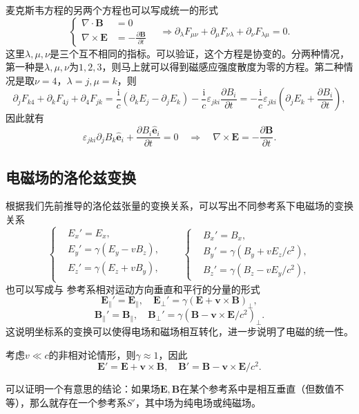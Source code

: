 \documentclass[UTF8]{ctexbook}
\renewcommand{\b}{\boldsymbol}
\renewcommand{\i}{\mathrm{i}}
\numberwithin{equation}{chapter}
\begin{document}
	麦克斯韦方程的另两个方程也可以写成统一的形式
	\[\left\{\begin{aligned}
		\nabla\cdot\b{B}&=0 \\
		\nabla\times\b{E}&=-\frac{\partial \b{B}}{\partial t} 
 	\end{aligned}
	\right.\quad \Rightarrow \partial_\lambda F_{\mu\nu}+\partial_\mu F_{\nu\lambda}+\partial_{\nu}F_{\lambda\mu}=0.\]
	这里$\lambda,\mu,\nu$是三个互不相同的指标。可以验证，这个方程是协变的。分两种情况，第一种是$\lambda,\mu,\nu$为$1,2,3$，则马上就可以得到磁感应强度散度为零的方程。第二种情况是取$\nu=4$，$\lambda=j,\mu=k$，则
	\[\partial_j F_{k4}+\partial_k F_{4j}+\partial_4 F_{jk}=\frac{\i}{c}(\partial_k E_j-\partial_j E_k)-\frac{\i}{c}\varepsilon_{jki}\frac{\partial B_i}{\partial t}=-\frac{\i}{c}\varepsilon_{jki}(\partial_j E_k+\frac{\partial B_i}{\partial t}),\]
	因此就有
	\[\varepsilon_{jki}\partial_j B_k\hat{\b{e}}_i+\frac{\partial B_i\hat{\b{e}}_i }{\partial t}=0\quad \Rightarrow \quad \nabla\times\b{E}=-\frac{\partial \b{B}}{\partial t}.\]
	
	\subsection{电磁场的洛伦兹变换}
	根据我们先前推导的洛伦兹张量的变换关系，可以写出不同参考系下电磁场的变换关系
	\[\left\{\begin{aligned}
		&E_x'=E_x,\\
		&E_y'=\gamma(E_y-vB_z),\\
		&E_z'=\gamma(E_z+vB_y),\\
	\end{aligned}\right.\qquad \left\{\begin{aligned}
	&B_x'=B_x,\\
	&B_y'=\gamma(B_y+vE_z/c^2),\\
	&B_z'=\gamma(B_z-vE_y/c^2),
\end{aligned}\right.\]
	也可以写成与 参考系相对运动方向垂直和平行的分量的形式
	\[\b{E}_{\parallel}'=\b{E}_\parallel,\quad \b{E}_{\perp}'=\gamma(\b{E}+\b{v}\times\b{B})_\perp,\]
	\[\b{B}_\parallel'=\b{B}_\parallel,\quad \b{B}_\perp'=\gamma(\b{B}-\b{v}\times\b{E}/c^2)_\perp.\]
	这说明坐标系的变换可以使得电场和磁场相互转化，进一步说明了电磁的统一性。
	
	考虑$v\ll c$的非相对论情形，则$\gamma\approx 1$，因此
	\[\b{E}'=\b{E}+\b{v}\times\b{B},\quad \b{B}'=\b{B}-\b{v}\times\b{E}/c^2.\]
	
	可以证明一个有意思的结论：如果场$\b{E},\b{B}$在某个参考系中是相互垂直（但数值不等），那么就存在一个参考系$S'$，其中场为纯电场或纯磁场。	
	
\end{document}
